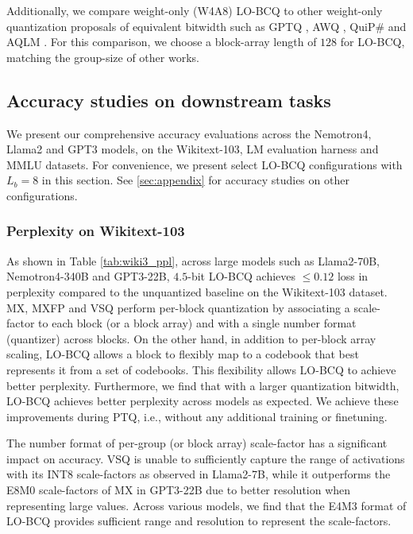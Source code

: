 Additionally, we compare weight-only (W4A8) LO-BCQ to other weight-only quantization proposals of equivalent bitwidth such as GPTQ \citep{frantar2023optq}, AWQ \citep{lin2023awq}, QuiP\# \citep{tseng2024quipbetterllmquantization} and AQLM \citep{egiazarian2024aqlm}. For this comparison, we choose a block-array length of $128$ for LO-BCQ, matching the group-size of other works.

\subsection{Accuracy studies on downstream tasks}
\vspace{-0.3em}
We present our comprehensive accuracy evaluations across the Nemotron4, Llama2 and GPT3 models, on the Wikitext-103, LM evaluation harness and MMLU datasets. For convenience, we present select LO-BCQ configurations with $L_b=8$ in this section. See \ref{sec:appendix} for accuracy studies on other configurations.

\subsubsection{Perplexity on Wikitext-103}

As shown in Table \ref{tab:wiki3_ppl}, across large models such as Llama2-70B, Nemotron4-340B and GPT3-22B, $4.5$-bit LO-BCQ achieves $\le0.12$ loss in perplexity compared to the unquantized baseline on the Wikitext-103 dataset. MX, MXFP and VSQ perform per-block quantization by associating a scale-factor to each block (or a block array) and with a single number format (quantizer) across blocks. On the other hand, in addition to per-block array scaling, LO-BCQ allows a block to flexibly map to a codebook that best represents it from a set of codebooks. This flexibility allows LO-BCQ to achieve better perplexity. Furthermore, we find that with a larger quantization bitwidth, LO-BCQ achieves better perplexity across models as expected. We achieve these improvements during PTQ, i.e., without any additional training or finetuning.

The number format of per-group (or block array) scale-factor has a significant impact on accuracy. VSQ is unable to sufficiently capture the range of activations with its INT8 scale-factors as observed in Llama2-7B, while it outperforms the E8M0 scale-factors of MX in GPT3-22B due to better resolution when representing large values. Across various models, we find that the E4M3 format of LO-BCQ provides sufficient range and resolution to represent the scale-factors.

